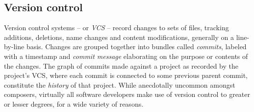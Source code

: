 
%
%
%
%
%
%
%

\subsection{Version control}
\label{ssec:version-control}


Version control systems\cite{loeliger2009git} -- or \emph{VCS} -- record
changes to sets of files, tracking additions, deletions, name changes and
content modifications, generally on a line-by-line basis. Changes are grouped
together into bundles called \emph{commits}, labeled with a timestamp and
\emph{commit message} elaborating on the purpose or contents of the changes.
The graph of commits made against a project as recorded by the project's VCS,
where each commit is connected to some previous parent commit, constitute the
\emph{history} of that project. While anecdotally uncommon amongst composers,
virtually all software developers make use of version control to greater or
lesser degrees, for a wide variety of reasons.

